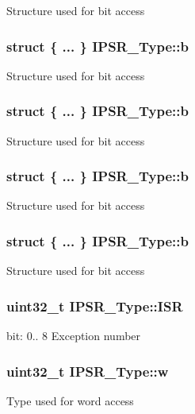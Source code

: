 Structure used for bit access \hypertarget{union_i_p_s_r___type_a119f0c37190e2d377093a8e200e1089c}{
\subsubsection[{b}]{\setlength{\rightskip}{0pt plus 5cm}struct \{ ... \}   I\-P\-S\-R\-\_\-\-Type\-::b}}\label{union_i_p_s_r___type_a119f0c37190e2d377093a8e200e1089c}
Structure used for bit access \hypertarget{union_i_p_s_r___type_a4cc022d3c6e4670c6e410968fe4edf06}{
\subsubsection[{b}]{\setlength{\rightskip}{0pt plus 5cm}struct \{ ... \}   I\-P\-S\-R\-\_\-\-Type\-::b}}\label{union_i_p_s_r___type_a4cc022d3c6e4670c6e410968fe4edf06}
Structure used for bit access \hypertarget{union_i_p_s_r___type_aa9916267c9436e800b931582da201003}{
\subsubsection[{b}]{\setlength{\rightskip}{0pt plus 5cm}struct \{ ... \}   I\-P\-S\-R\-\_\-\-Type\-::b}}\label{union_i_p_s_r___type_aa9916267c9436e800b931582da201003}
Structure used for bit access \hypertarget{union_i_p_s_r___type_a23c14601470ff92495d34a6503d6f74d}{
\subsubsection[{b}]{\setlength{\rightskip}{0pt plus 5cm}struct \{ ... \}   I\-P\-S\-R\-\_\-\-Type\-::b}}\label{union_i_p_s_r___type_a23c14601470ff92495d34a6503d6f74d}
Structure used for bit access \hypertarget{union_i_p_s_r___type_ab46e5f1b2f4d17cfb9aca4fffcbb2fa5}{
\subsubsection[{I\-S\-R}]{\setlength{\rightskip}{0pt plus 5cm}uint32\-\_\-t I\-P\-S\-R\-\_\-\-Type\-::\-I\-S\-R}}\label{union_i_p_s_r___type_ab46e5f1b2f4d17cfb9aca4fffcbb2fa5}
bit\-: 0.. 8 Exception number \hypertarget{union_i_p_s_r___type_a4adca999d3a0bc1ae682d73ea7cfa879}{
\subsubsection[{w}]{\setlength{\rightskip}{0pt plus 5cm}uint32\-\_\-t I\-P\-S\-R\-\_\-\-Type\-::w}}\label{union_i_p_s_r___type_a4adca999d3a0bc1ae682d73ea7cfa879}
Type used for word access 

